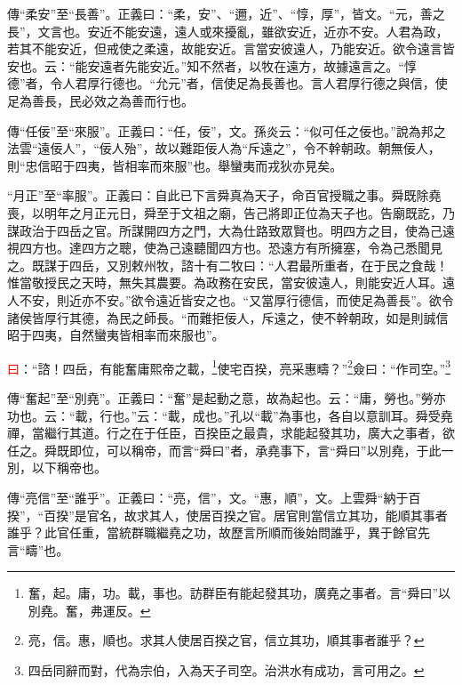 {\noindent\zhuan{}\fzbyks 傳“柔安”至“長善”。正義曰：“柔，安”、“邇，近”、“惇，厚”，皆文。“元，善之長”，文言也。安近不能安遠，遠人或來擾亂，雖欲安近，近亦不安。人君為政，若其不能安近，但戒使之柔遠，故能安近。言當安彼遠人，乃能安近。欲令遠言皆安也。云：“能安遠者先能安近。”知不然者，以牧在遠方，故據遠言之。“惇德”者，令人君厚行德也。“允元”者，信使足為長善也。言人君厚行德之與信，使足為善長，民必效之為善而行也。 \par}

{\noindent\zhuan{}\fzbyks 傳“任佞”至“來服”。正義曰：“任，佞”，文。孫炎云：“似可任之佞也。”說為邦之法雲“遠佞人”，“佞人殆”，故以難距佞人為“斥遠之”，令不幹朝政。朝無佞人，則“忠信昭于四夷，皆相率而來服”也。舉蠻夷而戎狄亦見矣。 \par}

{\noindent\shu{}\fzkt “月正”至“率服”。正義曰：自此已下言舜真為天子，命百官授職之事。舜既除堯喪，以明年之月正元日，舜至于文祖之廟，告己將即正位為天子也。告廟既訖，乃謀政治于四岳之官。所謀開四方之門，大為仕路致眾賢也。明四方之目，使為己遠視四方也。達四方之聰，使為己遠聽聞四方也。恐遠方有所擁塞，令為己悉聞見之。既謀于四岳，又別敕州牧，諮十有二牧曰：“人君最所重者，在于民之食哉！惟當敬授民之天時，無失其農要。為政務在安民，當安彼遠人，則能安近人耳。遠人不安，則近亦不安。”欲令遠近皆安之也。“又當厚行德信，而使足為善長”。欲令諸侯皆厚行其德，為民之師長。“而難拒佞人，斥遠之，使不幹朝政，如是則誠信昭于四夷，自然蠻夷皆相率而來服也”。 \par}

\textcolor{red}{曰}：“諮！四岳，有能奮庸熙帝之載，\footnote{奮，起。庸，功。載，事也。訪群臣有能起發其功，廣堯之事者。言“舜曰”以別堯。奮，弗運反。}使宅百揆，亮采惠疇？”\footnote{亮，信。惠，順也。求其人使居百揆之官，信立其功，順其事者誰乎？}僉曰：“作司空。”\footnote{四岳同辭而對，代為宗伯，入為天子司空。治洪水有成功，言可用之。}

{\noindent\zhuan{}\fzbyks 傳“奮起”至“別堯”。正義曰：“奮”是起動之意，故為起也。云：“庸，勞也。”勞亦功也。云：“載，行也。”云：“載，成也。”孔以“載”為事也，各自以意訓耳。舜受堯禪，當繼行其道。行之在于任臣，百揆臣之最貴，求能起發其功，廣大之事者，欲任之。舜既即位，可以稱帝，而言“舜曰”者，承堯事下，言“舜曰”以別堯，于此一別，以下稱帝也。 \par}

{\noindent\zhuan{}\fzbyks 傳“亮信”至“誰乎”。正義曰：“亮，信”，文。“惠，順”，文。上雲舜“納于百揆”，“百揆”是官名，故求其人，使居百揆之官。居官則當信立其功，能順其事者誰乎？此官任重，當統群職繼堯之功，故歷言所順而後始問誰乎，異于餘官先言“疇”也。 \par}

